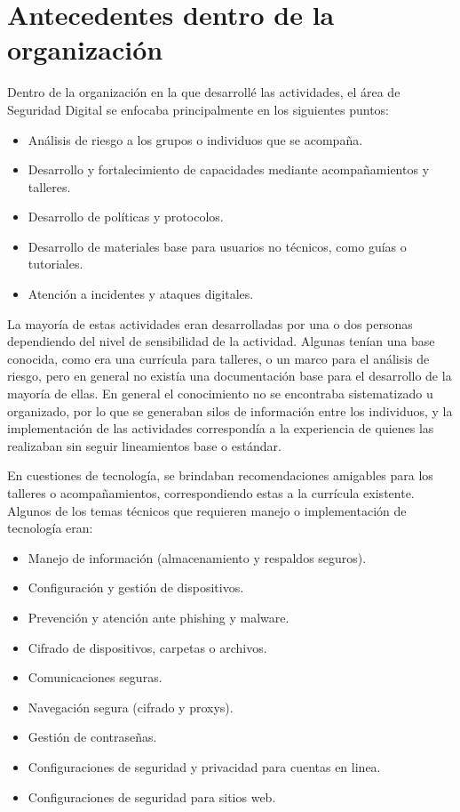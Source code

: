 \documentclass[12pt]{caltech_thesis}
\begin{document}
\section{Antecedentes dentro de la organización}

Dentro de la organización en la que desarrollé las actividades, el área de Seguridad Digital se enfocaba principalmente en los siguientes puntos:

\begin{itemize}
    \item Análisis de riesgo a los grupos o individuos que se acompaña.
    \item Desarrollo y fortalecimiento de capacidades mediante acompañamientos y talleres.
    \item Desarrollo de políticas y protocolos.
    \item Desarrollo de materiales base para usuarios no técnicos, como guías o tutoriales.
    \item Atención a incidentes y ataques digitales.
\end{itemize}

La mayoría de estas actividades eran desarrolladas por una o dos personas dependiendo del nivel de sensibilidad de la actividad. Algunas tenían una base conocida, como era una currícula para talleres, o un marco para el análisis de riesgo, pero en general no existía una documentación base para el desarrollo de la mayoría de ellas. En general el conocimiento no se encontraba sistematizado u organizado, por lo que se generaban silos de información entre los individuos, y la implementación de las actividades correspondía a la experiencia de quienes las realizaban sin seguir lineamientos base o estándar.

En cuestiones de tecnología, se brindaban recomendaciones amigables para los talleres o acompañamientos, correspondiendo estas a la currícula existente. Algunos de los temas técnicos que requieren manejo o implementación de tecnología eran:

\begin{itemize}
    \item Manejo de información (almacenamiento y respaldos seguros).
    \item Configuración y gestión de dispositivos.
    \item Prevención y atención ante phishing y malware.
    \item Cifrado de dispositivos, carpetas o archivos.
    \item Comunicaciones seguras.
    \item Navegación segura (cifrado y proxys).
    \item Gestión de contraseñas.
    \item Configuraciones de seguridad y privacidad para cuentas en linea.
    \item Configuraciones de seguridad para sitios web.
\end{itemize}
\end{document}
